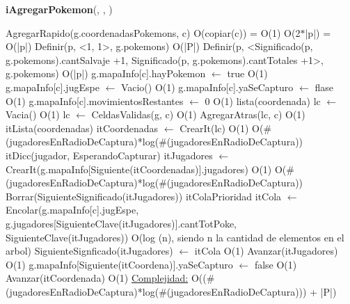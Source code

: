 \begin{Algoritmos}
\begin{algorithm}[H]{\textbf{iAgregarPokemon}(, , )}
	\begin{algorithmic}[1]
		\State AgregarRapido(g.coordenadasPokemons, c) \Comment O(copiar(c)) = O(1)
		 \Comment O(2$*$|p|) = O(|p|)
			\State Definir(p, <1, 1>, g.pokemons) \Comment O(|P|)
		\Else
			\State Definir(p, <Significado(p, g.pokemons).cantSalvaje +1, Significado(p, g.pokemons).cantTotales +1>, g.pokemons) \Comment O(|p|)
		\EndIf
		\State g.mapaInfo[c].hayPokemon $\gets$ true \Comment O(1)
		\State g.mapaInfo[c].jugEspe $\gets$ Vacio() \Comment O(1)
		\State g.mapaInfo[c].yaSeCapturo $\gets$ flase \Comment O(1)
 		\State g.mapaInfo[c].movimientosRestantes $\gets$ 0 \Comment O(1)
		\State lista(coordenada) lc $\gets$ Vacia() \Comment O(1)
		\State lc $\gets$ CeldasValidas(g, c) \Comment O(1)
		\State AgregarAtras(lc, c) \Comment O(1)
		\State itLista(coordenadas) itCoordenadas $\gets$ CrearIt(lc) \Comment O(1)
		 \Comment O($\#$(jugadoresEnRadioDeCaptura)*log($\#$(jugadoresEnRadioDeCaptura))
			\State itDicc(jugador, EsperandoCapturar) itJugadores $\gets$ CrearIt(g.mapaInfo[Siguiente(itCoordenadas)].jugadores) \Comment O(1)
			 \Comment O($\#$(jugadoresEnRadioDeCaptura)*log($\#$(jugadoresEnRadioDeCaptura))
					\State Borrar(SiguienteSignificado(itJugadores))				
				\EndIf
				\State itColaPrioridad itCola $\gets$ Encolar(g.mapaInfo[c].jugEspe, g.jugadores[SiguienteClave(itJugadores)].cantTotPoke, SiguienteClave(itJugadores)) \Comment O(log (n), siendo n la cantidad de elementos en el arbol)
				\State SiguienteSignficado(itJugadores) $\gets$ itCola \Comment O(1)
				\State Avanzar(itJugadores) \Comment O(1)
			\EndWhile
				\State g.mapaInfo[Siguiente(itCoordena)].yaSeCapturo $\gets$ false \Comment O(1)			
			\EndIf
			\State Avanzar(itCoordenada) \Comment O(1)
		\EndWhile
		\medskip
		\Statex \underline{Complejidad:} O(($\#$(jugadoresEnRadioDeCaptura)*log($\#$(jugadoresEnRadioDeCaptura))) + |P|)

\end{algorithmic}
\end{algorithm}
\end{Algoritmos}
